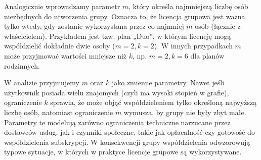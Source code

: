 Analogicznie wprowadzamy parametr $m$, który określa najmniejszą liczbę osób niezbędnych do utworzenia grupy. Oznacza to, że licencja grupowa jest ważna tylko wtedy, gdy zostanie wykorzystana przez co najmniej $m$ osób (łącznie z właścicielem). Przykładem jest tzw. plan „Duo”, w którym licencję mogą współdzielić dokładnie dwie osoby ($m=2, k=2$). W innych przypadkach $m$ może przyjmować wartości mniejsze niż $k$, np. $m=2, k=6$ dla planów rodzinnych.

W analizie przyjmujemy $m$ oraz $k$ jako zmienne parametry. Nawet jeśli użytkownik posiada wielu znajomych (czyli ma wysoki stopień w grafie), ograniczenie $k$ sprawia, że może objąć współdzieleniem tylko określoną najwyższą liczbę osób, natomiast ograniczenie $m$ wymusza, by grupy nie były zbyt małe. Parametry te modelują zarówno ograniczenia techniczne narzucane przez dostawców usług, jak i czynniki społeczne, takie jak opłacalność czy gotowość do współdzielenia subskrypcji. W konsekwencji grupy współdzielenia odwzorowują typowe sytuacje, w których w praktyce licencje grupowe są wykorzystywane.






